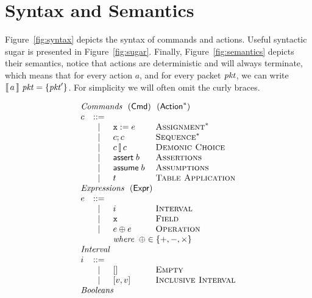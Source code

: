 \section{Syntax and Semantics}

Figure~\ref{fig:syntax} depicts the syntax of commands and
actions. Useful syntactic sugar is presented in
Figure~\ref{fig:sugar}. Finally, Figure~\ref{fig:semantics} depicts
their semantics, notice that actions are deterministic and will always
terminate, which means that for every action $a$, and for every packet
$\mathit{pkt}$, we can write $\llbracket\,a\,\rrbracket~\mathit{pkt} = \{\mathit{pkt}'\}$. For simplicity we
will often omit the curly braces.


\begin{figure}[ht]
  \[\begin{array}{l c l l}
      \multicolumn{4}{l}{\textit{Commands}~~(\Cmd)~~(\Action^*)}\\
      c & ::=& \\
        & \mid & \var x := e & \textsc{Assignment}^*\\
        & \mid & c;c & \textsc{Sequence}^* \\
        & \mid & c \angel c & \textsc{Demonic Choice}\\
        & \mid & \assert b & \textsc{Assertions} \\
        & \mid & \assume b & \textsc{Assumptions} \\
        & \mid & t & \textsc{Table Application}\\
      \multicolumn{4}{l}{\textit{Expressions}~~(\Expr)} \\
      e & ::= & \\
        & \mid & i            & \textsc{Interval} \\
        & \mid & \var x       & \textsc{Field} \\
        & \mid & e \oplus e   & \textsc{Operation} \\
        & &  \multicolumn{2}{l}{\textit{where}\;\; \oplus \in \{+,-,\times \}} \\
      \multicolumn{4}{l}{\textit{Interval}}\\
      i & ::= & \\
        & \mid & [] & \textsc{Empty} \\
        & \mid & [v, v] & \textsc{Inclusive Interval} \\
      \multicolumn{4}{l}{\textit{Booleans}}\\

\end{array}\]
\end{figure}
